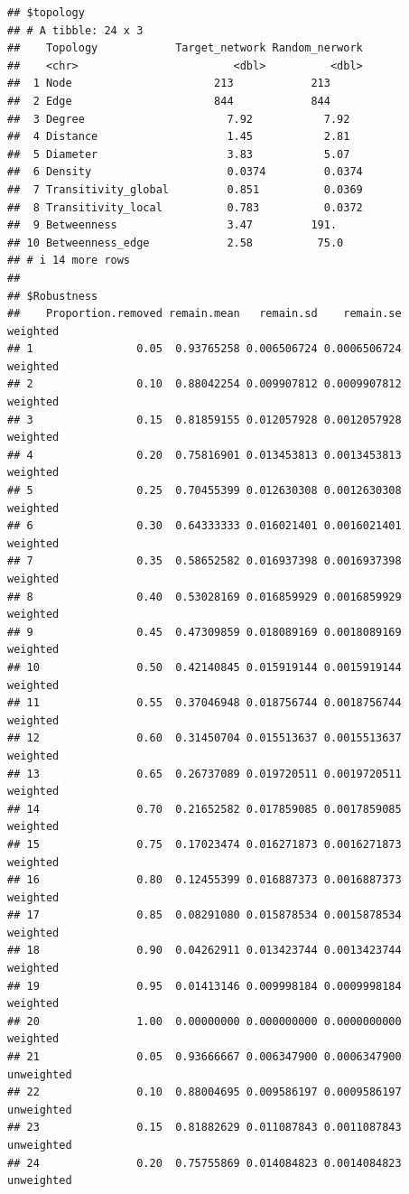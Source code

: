 \documentclass[
]{book}
\begin{document}
\begin{verbatim}
## $topology
## # A tibble: 24 x 3
##    Topology            Target_network Random_nerwork
##    <chr>                        <dbl>          <dbl>
##  1 Node                      213            213     
##  2 Edge                      844            844     
##  3 Degree                      7.92           7.92  
##  4 Distance                    1.45           2.81  
##  5 Diameter                    3.83           5.07  
##  6 Density                     0.0374         0.0374
##  7 Transitivity_global         0.851          0.0369
##  8 Transitivity_local          0.783          0.0372
##  9 Betweenness                 3.47         191.    
## 10 Betweenness_edge            2.58          75.0   
## # i 14 more rows
## 
## $Robustness
##    Proportion.removed remain.mean   remain.sd    remain.se   weighted
## 1                0.05  0.93765258 0.006506724 0.0006506724   weighted
## 2                0.10  0.88042254 0.009907812 0.0009907812   weighted
## 3                0.15  0.81859155 0.012057928 0.0012057928   weighted
## 4                0.20  0.75816901 0.013453813 0.0013453813   weighted
## 5                0.25  0.70455399 0.012630308 0.0012630308   weighted
## 6                0.30  0.64333333 0.016021401 0.0016021401   weighted
## 7                0.35  0.58652582 0.016937398 0.0016937398   weighted
## 8                0.40  0.53028169 0.016859929 0.0016859929   weighted
## 9                0.45  0.47309859 0.018089169 0.0018089169   weighted
## 10               0.50  0.42140845 0.015919144 0.0015919144   weighted
## 11               0.55  0.37046948 0.018756744 0.0018756744   weighted
## 12               0.60  0.31450704 0.015513637 0.0015513637   weighted
## 13               0.65  0.26737089 0.019720511 0.0019720511   weighted
## 14               0.70  0.21652582 0.017859085 0.0017859085   weighted
## 15               0.75  0.17023474 0.016271873 0.0016271873   weighted
## 16               0.80  0.12455399 0.016887373 0.0016887373   weighted
## 17               0.85  0.08291080 0.015878534 0.0015878534   weighted
## 18               0.90  0.04262911 0.013423744 0.0013423744   weighted
## 19               0.95  0.01413146 0.009998184 0.0009998184   weighted
## 20               1.00  0.00000000 0.000000000 0.0000000000   weighted
## 21               0.05  0.93666667 0.006347900 0.0006347900 unweighted
## 22               0.10  0.88004695 0.009586197 0.0009586197 unweighted
## 23               0.15  0.81882629 0.011087843 0.0011087843 unweighted
## 24               0.20  0.75755869 0.014084823 0.0014084823 unweighted

\end{verbatim}
\end{document}
